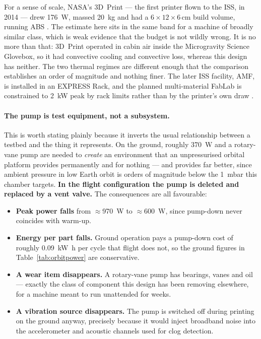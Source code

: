 \documentclass[11pt,a4paper]{article}
\begin{document}
For a sense of scale, NASA's 3D~Print --- the first printer flown to the ISS, in
2014 --- drew \SI{176}{\watt}, massed \SI{20}{\kilo\gram} and had a
\(6\times12\times6\,\)cm build volume, running ABS \cite{ismoverview2018}. The
estimate here sits in the same band for a machine of broadly similar class,
which is weak evidence that the budget is not wildly wrong. It is no more than
that: 3D~Print operated in cabin air inside the Microgravity Science Glovebox,
so it had convective cooling and convective loss, whereas this design has
neither. The two thermal regimes are different enough that the comparison
establishes an order of magnitude and nothing finer. The later ISS facility,
AMF, is installed in an EXPRESS Rack, and the planned multi-material FabLab is
constrained to \SI{2}{\kilo\watt} peak by rack limits rather than by the
printer's own draw \cite{ismoverview2018}.

\paragraph{The pump is test equipment, not a subsystem.}
This is worth stating plainly because it inverts the usual relationship between
a testbed and the thing it represents. On the ground, roughly \SI{370}{\watt}
and a rotary-vane pump are needed to \emph{create} an environment that an
unpressurised orbital platform provides permanently and for nothing --- and
provides far better, since ambient pressure in low Earth orbit is orders of
magnitude below the \SI{1}{\milli\bar} this chamber targets. \textbf{In the
flight configuration the pump is deleted and replaced by a vent valve.} The
consequences are all favourable:

\begin{itemize}
  \item \textbf{Peak power falls} from \(\approx\)\SI{970}{\watt} to
        \(\approx\)\SI{600}{\watt}, since pump-down never coincides with
        warm-up.
  \item \textbf{Energy per part falls.} Ground operation pays a pump-down cost
        of roughly \SI{0.09}{\kilo\watt\hour} per cycle that flight does not,
        so the ground figures in Table~\ref{tab:orbitpower} are conservative.
  \item \textbf{A wear item disappears.} A rotary-vane pump has bearings, vanes
        and oil --- exactly the class of component this design has been removing
        elsewhere, for a machine meant to run unattended for weeks.
  \item \textbf{A vibration source disappears.} The pump is switched off during
        printing on the ground anyway, precisely because it would inject
        broadband noise into the accelerometer and acoustic channels used for
        clog detection.
\end{itemize}
\end{document}
